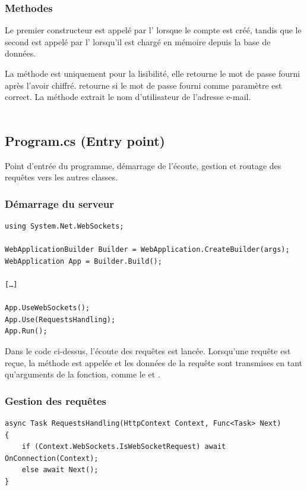 \documentclass[12pt]{report}
\begin{document}
	\subsubsection{Methodes}
	Le premier constructeur est appelé par l’ lorsque le compte est créé, tandis que le second est appelé par l’ lorsqu'il est chargé en mémoire depuis la base de données. 
	
	La méthode  est uniquement pour la lisibilité, elle retourne le mot de passe fourni après l'avoir chiffré.  retourne si le mot de passe fourni comme paramètre  est correct. La méthode  extrait le nom d'utilisateur de l'adresse e-mail.
	\\\\
	
	\subsection{Program.cs (Entry point)}
	
	Point d'entrée du programme, démarrage de l'écoute, gestion et routage des requêtes vers les autres classes.
	
	\subsubsection{Démarrage du serveur}
	\begin{verbatim}
using System.Net.WebSockets;

WebApplicationBuilder Builder = WebApplication.CreateBuilder(args);
WebApplication App = Builder.Build();

[…]

App.UseWebSockets();
App.Use(RequestsHandling);
App.Run();
	\end{verbatim}
	
	Dans le code ci-dessus, l'écoute des requêtes est lancée. Lorsqu'une requête est reçue, la méthode  est appelée et les données de la requête sont transmises en tant qu'arguments de la fonction, comme le  et .
	
	\subsubsection{Gestion des requêtes}
	\begin{verbatim}
async Task RequestsHandling(HttpContext Context, Func<Task> Next)
{
	if (Context.WebSockets.IsWebSocketRequest) await OnConnection(Context);
	else await Next();
}
	\end{verbatim}
	
\end{document}
